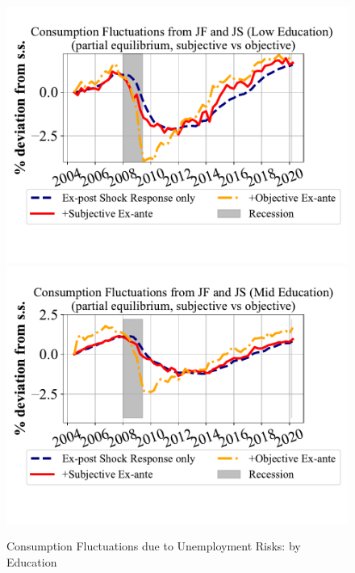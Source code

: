     \begin{figure}
        \centering
          \caption{Consumption Fluctuations due to Unemployment Risks: by Education}
\label{fig:pe_decompose_sub_obj_educ}
\includegraphics[width=0.6\linewidth]{text/chapter2/Figures/consumption_pe_JS_JF_deviation_machine_as_rational_LowEdu.pdf} \\
\vspace{-2em}
\includegraphics[width=0.6\linewidth]{text/chapter2/Figures/consumption_pe_JS_JF_deviation_machine_as_rational_MidEdu.pdf}\\


\end{figure}
